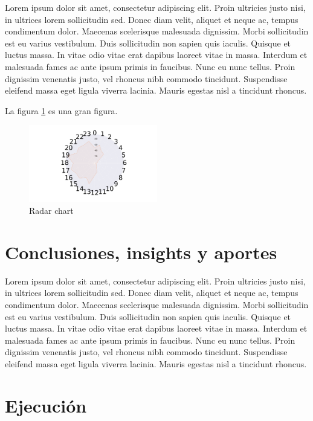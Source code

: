 \documentclass[a4paper]{article}
\begin{document}
 Lorem ipsum dolor sit amet, consectetur adipiscing elit. Proin ultricies justo nisi, in ultrices lorem sollicitudin sed. Donec diam velit, aliquet et neque ac, tempus condimentum dolor. Maecenas scelerisque malesuada dignissim. Morbi sollicitudin est eu varius vestibulum. Duis sollicitudin non sapien quis iaculis. Quisque et luctus massa. In vitae odio vitae erat dapibus laoreet vitae in massa. Interdum et malesuada fames ac ante ipsum primis in faucibus. Nunc eu nunc tellus. Proin dignissim venenatis justo, vel rhoncus nibh commodo tincidunt. Suspendisse eleifend massa eget ligula viverra lacinia. Mauris egestas nisl a tincidunt rhoncus. 

La figura \ref{fig:radar_chart} es una gran figura.

\begin{figure}[!hb]
  \centering
    \includegraphics[width=0.5\textwidth]{figures/radar_chart.png}
  \caption{Radar chart}
  \label{fig:radar_chart}
\end{figure}

\section{Conclusiones, insights y aportes}

 Lorem ipsum dolor sit amet, consectetur adipiscing elit. Proin ultricies justo nisi, in ultrices lorem sollicitudin sed. Donec diam velit, aliquet et neque ac, tempus condimentum dolor. Maecenas scelerisque malesuada dignissim. Morbi sollicitudin est eu varius vestibulum. Duis sollicitudin non sapien quis iaculis. Quisque et luctus massa. In vitae odio vitae erat dapibus laoreet vitae in massa. Interdum et malesuada fames ac ante ipsum primis in faucibus. Nunc eu nunc tellus. Proin dignissim venenatis justo, vel rhoncus nibh commodo tincidunt. Suspendisse eleifend massa eget ligula viverra lacinia. Mauris egestas nisl a tincidunt rhoncus. 


\newpage
\appendix

\section{Ejecución}
\end{document}
